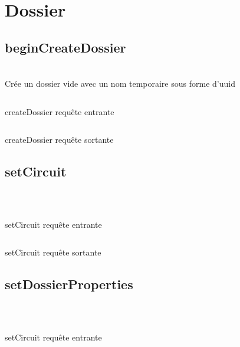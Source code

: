 \section{Dossier}
\subsection{beginCreateDossier}
\\

Crée un dossier vide avec un nom temporaire sous forme d'uuid

\begin{codesnippet}
\inputminted[frame=single,linenos,fontsize=\footnotesize]{javascript}{extraits/createDossier_in.js}
\caption{createDossier requête entrante}
\label{snip:getDossier_in}
\end{codesnippet}

\begin{codesnippet}
\inputminted[frame=single,linenos,fontsize=\footnotesize]{javascript}{extraits/createDossier_out.js}
\caption{createDossier requête sortante}
\label{snip:getDossier_out}
\end{codesnippet}


\subsection{setCircuit}
\\

\begin{codesnippet}
\inputminted[frame=single,linenos,fontsize=\footnotesize]{javascript}{extraits/setCircuit_in.js}
\caption{setCircuit requête entrante}
\label{snip:setCircuit_in}
\end{codesnippet}

\begin{codesnippet}
\inputminted[frame=single,linenos,fontsize=\footnotesize]{javascript}{extraits/setCircuit_out.js}
\caption{setCircuit requête sortante}
\label{snip:setCircuit_out}
\end{codesnippet}



\subsection{setDossierProperties}
\\

\begin{codesnippet}
\inputminted[frame=single,linenos,fontsize=\footnotesize]{javascript}{extraits/setDossierProperties_in.js}
\caption{setCircuit requête entrante}
\label{snip:setDossierProperties_in}
\end{codesnippet}

